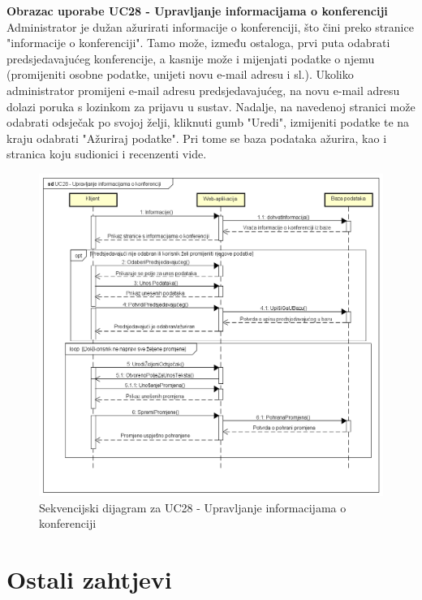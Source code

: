 				\eject

				\textbf{Obrazac uporabe UC28 - Upravljanje informacijama o konferenciji}\\
				Administrator je dužan ažurirati informacije o konferenciji, što čini preko stranice "informacije o konferenciji". Tamo može, između ostaloga, prvi puta odabrati predsjedavajućeg konferencije, a kasnije može i mijenjati podatke o njemu (promijeniti osobne podatke, unijeti novu e-mail adresu i sl.). Ukoliko administrator promijeni e-mail adresu predsjedavajućeg, na novu e-mail adresu dolazi poruka s lozinkom za prijavu u sustav. Nadalje, na navedenoj stranici može odabrati odsječak po svojoj želji, kliknuti gumb "Uredi", izmijeniti podatke te na kraju odabrati "Ažuriraj podatke". Pri tome se baza podataka ažurira, kao i stranica koju sudionici i recenzenti vide.
				\eject

				\begin{figure}[H]
					\includegraphics[scale=0.50]{dijagrami/UC28-UprInfoAdmin.png} 
					\centering
					\caption{Sekvencijski dijagram za UC28 - Upravljanje informacijama o konferenciji}
					\label{fig:sekvencijski4}
				\end{figure}

				\eject

	
		\section{Ostali zahtjevi}
		
